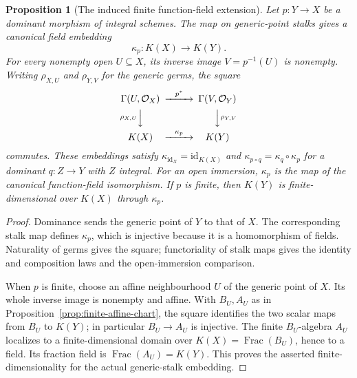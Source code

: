 \documentclass[11pt]{article}
\newtheorem{proposition}[theorem]{Proposition}
\theoremstyle{definition}
\theoremstyle{remark}
\DeclareMathOperator{\Frac}{Frac}
\begin{document}
\begin{proposition}[The induced finite function-field extension]
\label{prop:finite-function-field}
Let \(p:Y\to X\) be a dominant morphism of integral schemes. The
map on generic-point stalks gives a canonical field embedding
\[
  \kappa_p:K(X)\longrightarrow K(Y).
\]
For every nonempty open \(U\subseteq X\), its inverse image
\(V=p^{-1}(U)\) is nonempty. Writing \(\rho_{X,U}\) and
\(\rho_{Y,V}\) for the generic germs, the square
\[
\begin{CD}
\Gamma(U,\mathcal O_X) @>{p^*}>> \Gamma(V,\mathcal O_Y)\\
@V{\rho_{X,U}}VV @VV{\rho_{Y,V}}V\\
K(X) @>{\kappa_p}>> K(Y)
\end{CD}
\]
commutes. These embeddings satisfy
\(\kappa_{\mathrm{id}_X}=\mathrm{id}_{K(X)}\) and
\(\kappa_{p\circ q}=\kappa_q\circ\kappa_p\) for a dominant
\(q:Z\to Y\) with \(Z\) integral. For an open immersion,
\(\kappa_p\) is the map of the canonical function-field isomorphism.
If \(p\) is finite, then \(K(Y)\) is finite-dimensional over
\(K(X)\) through \(\kappa_p\).
\end{proposition}

\begin{proof}
Dominance sends the generic point of \(Y\) to that of \(X\).
The corresponding stalk map defines \(\kappa_p\), which is injective
because it is a homomorphism of fields. Naturality of germs gives the
square; functoriality of stalk maps gives the identity and composition
laws and the open-immersion comparison.

When \(p\) is finite, choose an affine neighbourhood \(U\) of the
generic point of \(X\). Its whole inverse image is nonempty and
affine. With \(B_U,A_U\) as in
Proposition~\ref{prop:finite-affine-chart}, the square identifies the
two scalar maps from \(B_U\) to \(K(Y)\); in particular
\(B_U\to A_U\) is injective. The finite \(B_U\)-algebra \(A_U\)
localizes to a finite-dimensional domain over
\(K(X)=\Frac(B_U)\), hence to a field. Its fraction field is
\(\Frac(A_U)=K(Y)\). This proves the asserted finite-dimensionality
for the actual generic-stalk embedding.
\end{proof}
\end{document}
